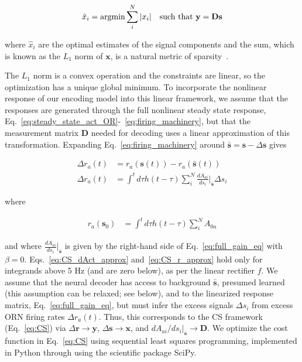 \documentclass[9pt,lineno]{elife}
\begin{document}
\begin{align}
\hat x_i = \textup{argmin} \sum_i^N |x_i| \quad \textup{such that } \mathbf y = \mathbf D\mathbf s
\label{eq:CS}
\end{align}

where $\hat x_i$ are the optimal estimates of the signal components and the sum, which is known as the $L_1$ norm of $\mathbf x$, is a natural metric of sparsity~\citep{CS_donoho}. 

The $L_1$ norm is a convex operation and the constraints are linear, so the optimization has a unique global minimum. To incorporate the nonlinear response of our encoding model into this linear framework, we assume that the responses are generated through the full nonlinear steady state response, Eq.~\ref{eq:steady_state_act_OR}-~\ref{eq:firing_machinery}, but that the measurement matrix $\mathbf D$ needed for decoding uses a linear approximation of this transformation.  Expanding Eq.~\ref{eq:firing_machinery} around $\bar{\mathbf s} = \mathbf s - \Delta \mathbf s$ gives

\begin{align}
\Delta r_a(t) &= r_a(\mathbf s(t)) - r_a(\bar{\mathbf s}(t)) \nonumber \\
\Delta r_a(t) &= \int^t d\tau h(t- \tau)\sum_i^N\frac{dA_{ai}}{ds_i}\bigg|_{\bar{\mathbf s}}\Delta s_i \label{eq:CS_dAct_approx}
\end{align}

where 

\begin{align}
r_a(\mathbf s_0) &= \int^t d\tau h(t- \tau)\sum_i^NA_{0a} 
\label{eq:CS_r_approx} 
\end{align}

and where $\frac{dA_{ai}}{ds_i}\big|_{\bar{\mathbf s}}$ is given by the right-hand side of Eq.~\ref{eq:full_gain_eq} with $\beta = 0$. Eqs.~\ref{eq:CS_dAct_approx} and~\ref{eq:CS_r_approx} hold only for integrands above 5 Hz (and are zero below), as per the linear rectifier $f$. We assume that the neural decoder has access to background $\bar{\mathbf s}$, presumed learned (this assumption can be relaxed; see below), and to  the linearized response matrix, Eq.~\ref{eq:full_gain_eq}, but must infer the excess signals $\Delta s_i$ from excess ORN firing rates $\Delta r_a(t)$. Thus, this corresponds to the CS framework (Eq.~\ref{eq:CS})  via $\Delta \mathbf {r} \rightarrow \mathbf y$, $\Delta \mathbf s \rightarrow \mathbf x$, and $dA_{ai}/{ds_i}\big|_{\bar {\mathbf s}} \rightarrow \mathbf D$. We optimize the cost function in Eq.~\ref{eq:CS} using sequential least squares programming, implemented in Python through using the scientific package SciPy. 
\end{document}
